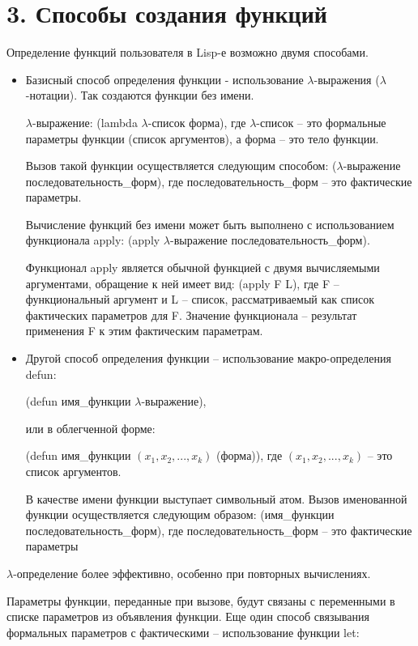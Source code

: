\documentclass[12pt]{report}
\begin{document}
\section*{3. Способы создания функций}

Определение функций пользователя в Lisp-е возможно двумя способами.


\begin{itemize}
	\item Базисный способ  определения  функции - использование $\lambda$-выражения ($\lambda$-нотации). Так создаются функции без имени.
	
	$\lambda$-выражение: (lambda $\lambda$-список форма), 
	где $\lambda$-список --  это формальные параметры функции (список аргументов), а форма -- это тело функции.
	
	Вызов такой функции осуществляется следующим способом: ($\lambda$-выражение последовательность\_форм), 
	где последовательность\_форм -- это фактические параметры.
	
	Вычисление функций без имени может быть выполнено с использованием функционала apply: (apply $\lambda$-выражение последовательность\_форм).
	
	Функционал apply является обычной функцией с двумя  вычисляемыми аргументами, обращение к ней имеет вид: (apply F L), где F – функциональный аргумент и L -- список, рассматриваемый как список фактических параметров для F. Значение функционала -- результат применения F к этим фактическим параметрам.
	
	\item Другой способ определения функции -- использование макро-определения defun: 
	
	(defun имя\_функции $\lambda$-выражение), 
	
	или  в облегченной форме:
	
	(defun имя\_функции $(x_1, x_2, ..., x_k)$ (форма)), 
	где $(x_1, x_2, ..., x_k)$ -- это  список аргументов.
	
	В качестве имени функции выступает символьный атом. 
	Вызов именованной функции осуществляется следующим образом: (имя\_функции последовательность\_форм), 
	где последовательность\_форм -- это фактические параметры
	
\end{itemize}

$\lambda$-определение более эффективно, особенно при повторных вычислениях. 

Параметры функции, переданные при вызове, будут связаны с переменными в списке параметров из объявления функции. Еще один способ связывания формальных параметров с фактическими -- использование функции let:
\end{document}

